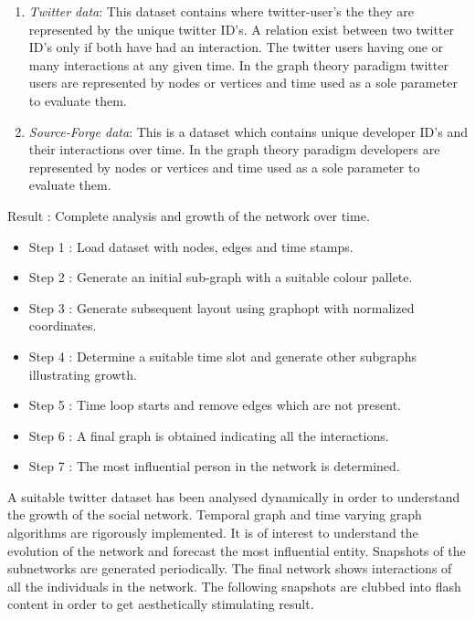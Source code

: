 \begin{enumerate}
\item {\em Twitter data}: This dataset contains where twitter-user's the they are represented by the unique
twitter ID's. A relation exist between two twitter ID's only if both have had an interaction. The twitter
users having one or many interactions at any given time. In the graph theory paradigm twitter users are
represented by nodes or vertices and time used as a sole parameter to evaluate them.

\item {\em Source-Forge data}: This is a dataset which contains unique developer ID's and their interactions over time.
In the graph theory paradigm developers are represented by nodes or vertices and time used as a sole parameter to evaluate them.
\end{enumerate}


\noindent Result : Complete analysis and growth of the network over time.

\begin{itemize}
\item Step 1 : Load dataset with nodes, edges and time stamps.
\item Step 2 : Generate an initial sub-graph with a suitable colour pallete.
\item Step 3 : Generate subsequent layout using graphopt with normalized coordinates.
\item Step 4 : Determine a suitable time slot and generate other subgraphs illustrating growth.
\item Step 5 : Time loop starts and remove edges which are not present.
\item Step 6 : A final graph is obtained indicating all the interactions.
\item Step 7 : The most influential person in the network is determined.
\end{itemize}


A suitable twitter dataset has been analysed dynamically in order to understand the growth of the social network.
Temporal graph and time varying graph algorithms are rigorously implemented. It is of interest to understand the evolution
of the network and forecast the most influential entity. Snapshots of the subnetworks are generated periodically.
The final network shows interactions of all the individuals in the network. The following snapshots are clubbed into
flash content in order to get aesthetically stimulating result.

